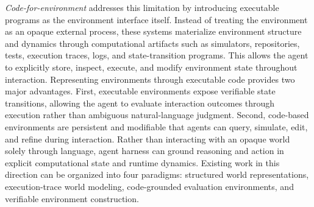 \documentclass{llmxive}
\begin{document}
\textit{Code-for-environment} addresses this limitation by
introducing executable programs as the environment interface
itself.
Instead of treating the environment as an opaque external process,
these systems materialize environment structure and dynamics
through computational artifacts such as simulators,
repositories, tests, execution traces, logs, and state-transition
programs.
This allows the agent to explicitly store, inspect, execute,
and modify environment state throughout interaction.
Representing environments through executable code provides two
major advantages.
First, executable environments expose verifiable state
transitions, allowing the agent to evaluate interaction
outcomes through execution rather than ambiguous natural-language
judgment.
Second, code-based environments are persistent and
modifiable that agents can query, simulate, edit,
and refine during interaction.
Rather than interacting with an opaque world solely through language, agent harness can ground reasoning and action in explicit computational state and runtime dynamics. 
Existing work in this direction can be organized into four
paradigms: structured world representations, execution-trace world
modeling, code-grounded evaluation environments, and verifiable
environment construction.
\end{document}
